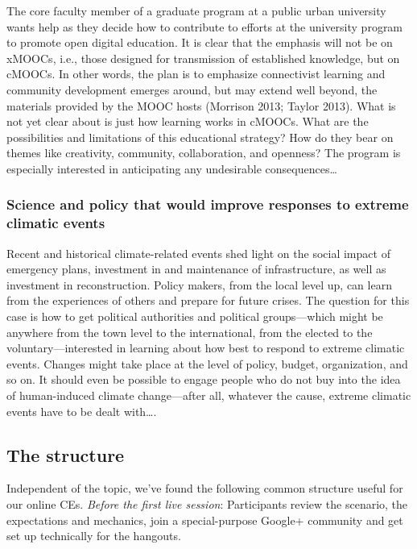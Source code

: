 The core faculty member of a graduate program at a public urban
university wants help as they decide how to contribute to efforts at the
university program to promote open digital education. It is clear that
the emphasis will not be on xMOOCs, i.e., those designed for
transmission of established knowledge, but on cMOOCs. In other words,
the plan is to emphasize connectivist learning and community development
emerges around, but may extend well beyond, the materials provided by
the MOOC hosts (Morrison 2013; Taylor 2013). What is not yet clear about
is just how learning works in cMOOCs. What are the possibilities and
limitations of this educational strategy? How do they bear on themes
like creativity, community, collaboration, and openness? The program is
especially interested in anticipating any undesirable
consequences\ldots{}

\subsubsection{Science and policy that would improve responses to
extreme climatic events}

Recent and historical climate-related events shed light on the social
impact of emergency plans, investment in and maintenance of
infrastructure, as well as investment in reconstruction. Policy makers,
from the local level up, can learn from the experiences of others and
prepare for future crises. The question for this case is how to get
political authorities and political groups---which might be anywhere
from the town level to the international, from the elected to the
voluntary---interested in learning about how best to respond to extreme
climatic events. Changes might take place at the level of policy,
budget, organization, and so on. It should even be possible to engage
people who do not buy into the idea of human-induced climate
change---after all, whatever the cause, extreme climatic events have to
be dealt with\ldots{}.

\subsection{The structure}

Independent of the topic, we've found the following common structure
useful for our online CEs. \emph{Before the first live session}:
Participants review the scenario, the expectations and mechanics, join a
special-purpose Google+ community and get set up technically for the
hangouts.

